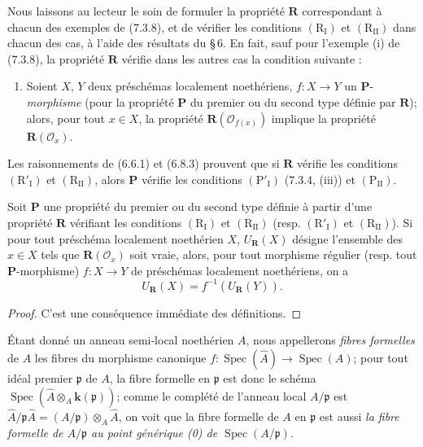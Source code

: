 \begin{remark}[7.3.11]
\label{IV.2.s7.3.11-fr}
Nous laissons au lecteur le soin de formuler la propriété $\boldsymbol R$
correspondant à chacun des exemples de (7.3.8), et de vérifier les
conditions $(\mathrm R_{\mathrm I})$ et $(\mathrm R_{\mathrm{II}})$ dans
chacun des cas, à l'aide des résultats du \S\,6. En fait, sauf pour
l'exemple (i) de (7.3.8), la propriété $\boldsymbol R$ vérifie dans les
autres cas la condition suivante :
\begin{enumerate}
\item[$(\mathrm R'_{\mathrm I})$] Soient $X$, $Y$ deux préschémas
localement noethériens, $f:X\to Y$ un $\boldsymbol P$-\emph{morphisme} (pour la
propriété $\boldsymbol P$ du premier ou du second type définie par
$\boldsymbol R$); alors, pour tout $x\in X$, la propriété
$\boldsymbol R(\mathscr O_{f(x)})$ implique la propriété
$\boldsymbol R(\mathscr O_x)$.
\end{enumerate}

Les raisonnements de (6.6.1) et (6.8.3) prouvent que si
$\boldsymbol R$ vérifie les conditions $(\mathrm R'_{\mathrm I})$ et
$(\mathrm R_{\mathrm{II}})$, alors $\boldsymbol P$ vérifie les conditions
$(\mathrm P'_{\mathrm I})$ (7.3.4, (iii)) et
$(\mathrm P_{\mathrm{II}})$.
\end{remark}

\begin{proposition}[7.3.12]
\label{IV.2.s7.3.12-fr}
Soit $\boldsymbol P$ une propriété du premier ou du second type définie à
partir d'une propriété $\boldsymbol R$ vérifiant les conditions
$(\mathrm R_{\mathrm I})$ et $(\mathrm R_{\mathrm{II}})$ \textup{(resp.}
$(\mathrm R'_{\mathrm I})$ et $(\mathrm R_{\mathrm{II}})$). Si pour tout
préschéma localement noethérien $X$, $U_{\mathbf{R}}(X)$ désigne
l'ensemble des $x\in X$ tels que $\boldsymbol R(\mathscr O_x)$ soit vraie,
alors, pour tout morphisme régulier \textup{(resp.} tout
$\boldsymbol P$-morphisme) $f:X\to Y$ de préschémas localement
noethériens, on a
\begin{equation}
U_{\mathbf{R}}(X)=f^{-1}(U_{\mathbf{R}}(Y)).
\tag{7.3.12.1}
\label{IV.2.eq.7.3.12.1-fr}
\end{equation}
\end{proposition}

\begin{proof}
C'est une conséquence immédiate des définitions.
\end{proof}

\begin{env}[7.3.13]
\label{IV.2.s7.3.13-fr}
Étant donné un anneau semi-local noethérien $A$, nous appellerons
\emph{fibres formelles} de $A$ les fibres du morphisme canonique
$f:\operatorname{Spec}(\widehat A)\to\operatorname{Spec}(A)$; pour tout
idéal premier $\mathfrak p$ de $A$, la fibre formelle en $\mathfrak p$ est
donc le schéma
$\operatorname{Spec}(\widehat A\otimes_A \boldsymbol{k}(\mathfrak p))$; comme le
complété de l'anneau local $A/\mathfrak p$ est
$\widehat A/\mathfrak p\widehat A=(A/\mathfrak p)\otimes_A\widehat A$, on
voit que la fibre formelle de $A$ en $\mathfrak p$ est aussi \emph{la
fibre formelle de $A/\mathfrak p$ au point générique \textup{(0)} de
$\operatorname{Spec}(A/\mathfrak p)$}.
\end{env}

